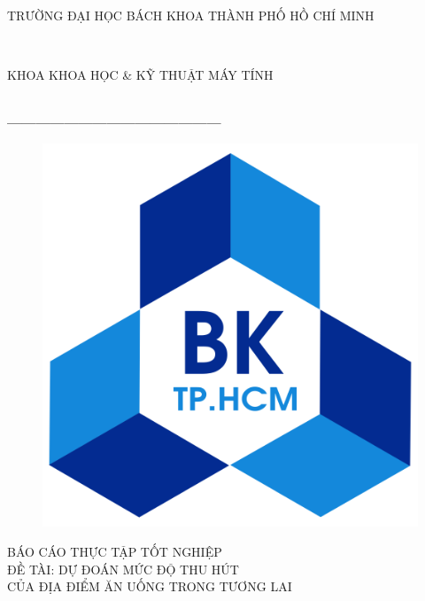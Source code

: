 \documentclass[12pt]{extarticle}
\begin{document}
\begin{titlepage}
	\thispagestyle{empty}
	\thisfancypage{
	\setlength{\fboxsep}{0pt}
	\fbox}{} 
	\begin{center}
		\begin{large}
			TRƯỜNG ĐẠI HỌC BÁCH KHOA THÀNH PHỐ HỒ CHÍ MINH
		\end{large} \\	
		\begin{large}
			KHOA KHOA HỌC \& KỸ THUẬT MÁY TÍNH
		\end{large} \\
		\textbf{---------------------------------------------}\\[1cm]

		\begin{figure}[h!]
			\includegraphics{logo}
			\centering
		\end{figure}

		\vspace{1cm}

		{\fontsize{40pt}{1}\selectfont BÁO CÁO THỰC TẬP TỐT NGHIỆP}\\
		{\fontsize{20pt}{1}\selectfont ĐỀ TÀI: DỰ ĐOÁN MỨC ĐỘ THU HÚT \\ CỦA ĐỊA ĐIỂM ĂN UỐNG TRONG TƯƠNG LAI}\\[3cm]
	\end{center}


\end{titlepage}
\end{document}
